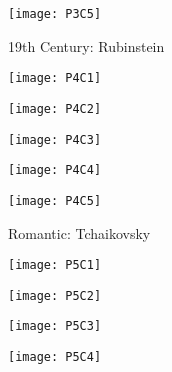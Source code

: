 \begin{figure}[h]
\caption{19th Century: Rubinstein}
\centering
\texttt{[image: P3C5]}
\end{figure}

\begin{figure}
\centering
\begin{minipage}{.5\textwidth}
  \centering
  \texttt{[image: P4C1]}
  \label{fig:test1}
\end{minipage}%
\begin{minipage}{.5\textwidth}
  \centering
  \texttt{[image: P4C2]}
  \label{fig:test2}
\end{minipage}
\end{figure}

\begin{figure}
\centering
\begin{minipage}{.5\textwidth}
  \centering
  \texttt{[image: P4C3]}
  \label{fig:test1}
\end{minipage}%
\begin{minipage}{.5\textwidth}
  \centering
  \texttt{[image: P4C4]}
  \label{fig:test2}
\end{minipage}
\end{figure}

\begin{figure}[h]
\caption{Romantic: Tchaikovsky}
\centering
\texttt{[image: P4C5]}
\end{figure}

\begin{figure}
\centering
\begin{minipage}{.5\textwidth}
  \centering
  \texttt{[image: P5C1]}
  \label{fig:test1}
\end{minipage}%
\begin{minipage}{.5\textwidth}
  \centering
  \texttt{[image: P5C2]}
  \label{fig:test2}
\end{minipage}
\end{figure}

\begin{figure}
\centering
\begin{minipage}{.5\textwidth}
  \centering
  \texttt{[image: P5C3]}
  \label{fig:test1}
\end{minipage}%
\begin{minipage}{.5\textwidth}
  \centering
  \texttt{[image: P5C4]}
  \label{fig:test2}
\end{minipage}
\end{figure}


